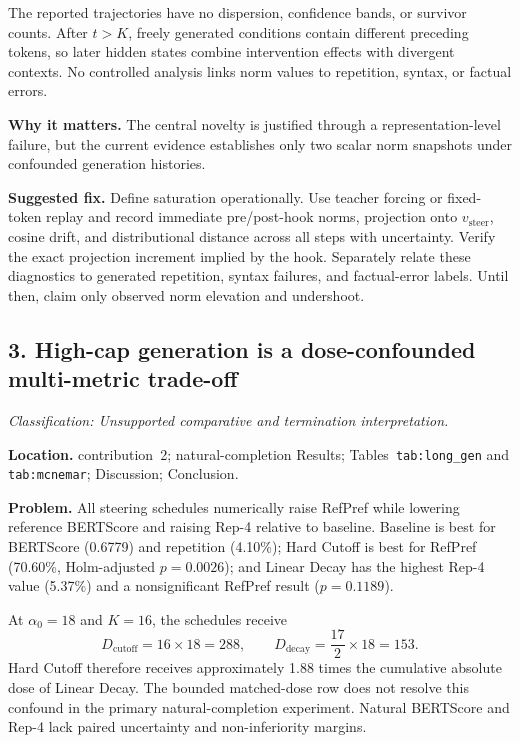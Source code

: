 \documentclass[11pt]{article}
\newcommand{\findinglabel}[1]{\textbf{#1}}
\newcommand{\classification}[1]{\textit{Classification: #1.}}
\begin{document}
The reported trajectories have no dispersion, confidence bands, or survivor counts.  After $t>K$, freely generated conditions contain different preceding tokens, so later hidden states combine intervention effects with divergent contexts.  No controlled analysis links norm values to repetition, syntax, or factual errors.

\findinglabel{Why it matters.} The central novelty is justified through a representation-level failure, but the current evidence establishes only two scalar norm snapshots under confounded generation histories.

\findinglabel{Suggested fix.} Define saturation operationally.  Use teacher forcing or fixed-token replay and record immediate pre/post-hook norms, projection onto $v_{\text{steer}}$, cosine drift, and distributional distance across all steps with uncertainty.  Verify the exact projection increment implied by the hook.  Separately relate these diagnostics to generated repetition, syntax failures, and factual-error labels.  Until then, claim only observed norm elevation and undershoot.

\subsection*{3. High-cap generation is a dose-confounded multi-metric trade-off}

\classification{Unsupported comparative and termination interpretation}

\findinglabel{Location.} contribution~2; natural-completion Results; Tables~\texttt{tab:long\_gen} and \texttt{tab:mcnemar}; Discussion; Conclusion.

\findinglabel{Problem.} All steering schedules numerically raise RefPref while lowering reference BERTScore and raising Rep-4 relative to baseline.  Baseline is best for BERTScore (0.6779) and repetition (4.10\%); Hard Cutoff is best for RefPref (70.60\%, Holm-adjusted $p=0.0026$); and Linear Decay has the highest Rep-4 value (5.37\%) and a nonsignificant RefPref result ($p=0.1189$).

At $\alpha_0=18$ and $K=16$, the schedules receive
\[
D_{\text{cutoff}}=16\times18=288,
\qquad
D_{\text{decay}}=\frac{17}{2}\times18=153.
\]
Hard Cutoff therefore receives approximately 1.88 times the cumulative absolute dose of Linear Decay.  The bounded matched-dose row does not resolve this confound in the primary natural-completion experiment.  Natural BERTScore and Rep-4 lack paired uncertainty and non-inferiority margins.
\end{document}
